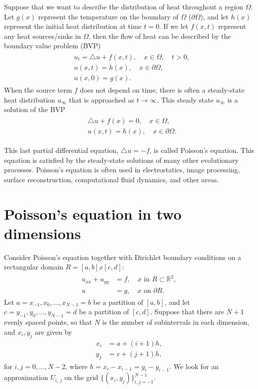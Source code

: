 \label{lab:poisson2d}
 
Suppose that we want to describe the distribution of heat throughout a region $\Omega$.
Let $g(x)$ represent the temperature on the boundary of $\Omega$ ($\partial \Omega$), and let $h(x)$ represent the initial heat distribution at time $t = 0$.
If we let $f(x,t)$ represent any heat sources/sinks in $\Omega$, then the flow of heat can be described by the boundary value problem (BVP)
\begin{align}
	\begin{split}
		& { } u_t = \triangle u + f(x,t), \quad x \in \Omega, \quad t >0,\\
		& { }u(x,t) = h(x), \quad x \in \partial \Omega, \\
		& { }u(x,0) = g(x).
	\end{split}
\end{align}
When the source term $f$ does not depend on time, there is often a steady-state heat distribution $u_{\infty}$ that is approached as $t \to \infty$.
This steady state $u_{\infty}$ is a solution of the BVP
\begin{align}
	\begin{split}
		& { }  \triangle u + f(x) = 0, \quad x \in \Omega,\\
		& { }u(x,t) = h(x), \quad x \in \partial \Omega.
	\end{split}
\end{align}

This last partial differential equation, $\triangle u = -f$, is called Poisson's equation.
This equation is satisfied by the steady-state solutions of many other evolutionary processes.
Poisson's equation is often used in electrostatics, image processing, surface reconstruction, computational fluid dynamics, and other areas. 


\section*{Poisson's equation in two dimensions}

 Consider Poisson's equation together with Dirichlet boundary conditions on a rectangular  domain $R = [a,b] x [c,d]$:
 \begin{align}
	\begin{split}
 	u_{xx} + u_{yy} &= f,\quad x \text{ in } R \subset \mathbb{R}^2,\\
 	u &= g, \quad x \text{ on } \partial R.
	\end{split}\label{eqn:2d_poisson}
\end{align}
Let $a = x_{-1}, x_0, \ldots, x_{N-1} = b$ be a partition of $[a,b]$, and let $c = y_{-1}, y_0, \ldots, y_{N-1} = d$ be a partition of $[c,d]$.
Suppose that there are $N+1$ evenly spaced points, so that $N$ is the number of subintervals in each dimension, and $x_i, y_j$ are given by 
\begin{align*}
	x_i &= a + (i+1)h, \\
	y_j &= c + (j+1)h,
\end{align*}
for $i,j = 0, \ldots, N-2$, where $h = x_i-x_{i-1} = y_i-y_{i-1}$.
We look for an approximation $U_{i,\,j}$ on the grid $\{(x_i,y_j)\}_{i,j=-1}^{N-1}$.

